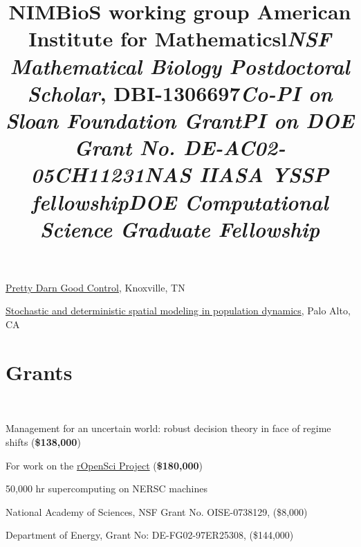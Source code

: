 \documentclass[margin]{res}
\begin{document}
\begin{resume}
\title{NIMBioS working group }
\begin{position}
\href{http://www.nimbios.org/workinggroups/WG_PDG}{Pretty Darn Good Control}, Knoxville, TN  
\vspace{-.25cm}
\end{position}

\title{American Institute for Mathematics}
\begin{position}
 \href{http://www.aimath.org/WWN/populationmodel}{Stochastic and deterministic spatial modeling in population dynamics}, Palo Alto, CA  \vspace{-.25cm}
\end{position}

 
\section{Grants}
\begin{format}
\title{l} \\
\body
\end{format}

\title{\emph{\textbf{NSF} Mathematical Biology Postdoctoral Scholar}, DBI-1306697}
\begin{position}
  Management for an uncertain world: robust decision theory in face of regime shifts (\textbf{\$138,000})
  \vspace{-.25cm}
\end{position}

\title{\emph{Co-PI on \textbf{Sloan Foundation} Grant}}
\begin{position}
  For work on the \href{http://ropensci.org}{rOpenSci Project}  (\textbf{\$180,000})
  \vspace{-.25cm}
\end{position}

\title{\emph{PI on DOE Grant No. DE-AC02-05CH11231}}
\begin{position} 
50,000 hr supercomputing on NERSC machines
  \vspace{-.25cm}
\end{position}

\title{\emph{\textbf{NAS} IIASA YSSP fellowship}}
\begin{position} 
  National Academy of Sciences, NSF Grant No. OISE-0738129, (\$8,000)
  \vspace{-.25cm}
\end{position}

\title{\emph{\textbf{DOE} Computational Science Graduate Fellowship}}
\begin{position} 
  Department of Energy, Grant No: DE-FG02-97ER25308, (\$144,000)
  \vspace{-.25cm}
\end{position}



\end{resume}
\end{document}
